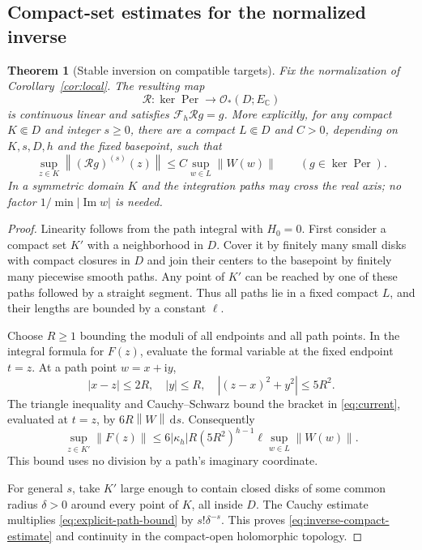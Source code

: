 \documentclass[11pt,a4paper]{article}
\numberwithin{equation}{section}
\newtheorem{theorem}{Theorem}[section]
\theoremstyle{definition}
\theoremstyle{remark}
\newcommand{\C}{\mathbb C}
\newcommand{\ii}{\mathrm i}
\newcommand{\dd}{\,\mathrm d}
\newcommand{\Hol}{\mathcal O}
\newcommand{\Fu}{\mathcal F_h}
\newcommand{\Per}{\operatorname{Per}}
\newcommand{\norm}[1]{\left\lVert#1\right\rVert}
\begin{document}
\subsection{Compact-set estimates for the normalized inverse}

\begin{theorem}[Stable inversion on compatible targets]\label{thm:stable-inverse}
Fix the normalization of Corollary~\ref{cor:local}. The resulting map
\[
 \mathcal R:\ker\Per\longrightarrow\Hol_*(D;E_\C)
\]
is continuous linear and satisfies $\Fu\mathcal Rg=g$. More explicitly, for
any compact $K\Subset D$ and integer $s\ge0$, there are a compact $L\Subset D$
and $C>0$, depending on $K,s,D,h$ and the fixed basepoint, such that
\begin{equation}\label{eq:inverse-compact-estimate}
 \sup_{z\in K}\norm{(\mathcal Rg)^{(s)}(z)}
       \le C\sup_{w\in L}\norm{W(w)}
       \qquad(g\in\ker\Per).
\end{equation}
In a symmetric domain $K$ and the integration paths may cross the real axis;
no factor $1/\min|\operatorname{Im}w|$ is needed.
\end{theorem}
\begin{proof}
Linearity follows from the path integral with $H_0=0$. First consider a compact
set $K'$ with a neighborhood in $D$. Cover it by finitely many small disks
with compact closures in $D$ and join their centers to the basepoint by
finitely many piecewise smooth paths. Any point of $K'$ can be reached by
one of these paths followed by a straight segment. Thus all paths lie in a
fixed compact $L$, and their lengths are bounded by a constant $\ell$.

Choose $R\ge1$ bounding the moduli of all endpoints and all path points.
In the integral formula for $F(z)$, evaluate the formal variable at the
fixed endpoint $t=z$. At a path point $w=x+\ii y$,
\[
 |x-z|\le2R,\quad |y|\le R,\quad
 |(z-x)^2+y^2|\le5R^2.
\]
The triangle inequality and Cauchy--Schwarz bound the bracket in
\eqref{eq:current}, evaluated at $t=z$, by $6R\norm W\dd s$.
Consequently
\begin{equation}\label{eq:explicit-path-bound}
 \sup_{z\in K'}\norm{F(z)}
 \le 6|\kappa_h|R(5R^2)^{h-1}\ell\sup_{w\in L}\norm{W(w)}.
\end{equation}
This bound uses no division by a path's imaginary coordinate.

For general $s$, take $K'$ large enough to contain closed disks of some common
radius $\delta>0$ around every point of $K$, all inside $D$. The Cauchy
estimate multiplies \eqref{eq:explicit-path-bound} by $s!\delta^{-s}$.
This proves \eqref{eq:inverse-compact-estimate} and continuity in the
compact-open holomorphic topology.
\end{proof}
\end{document}
